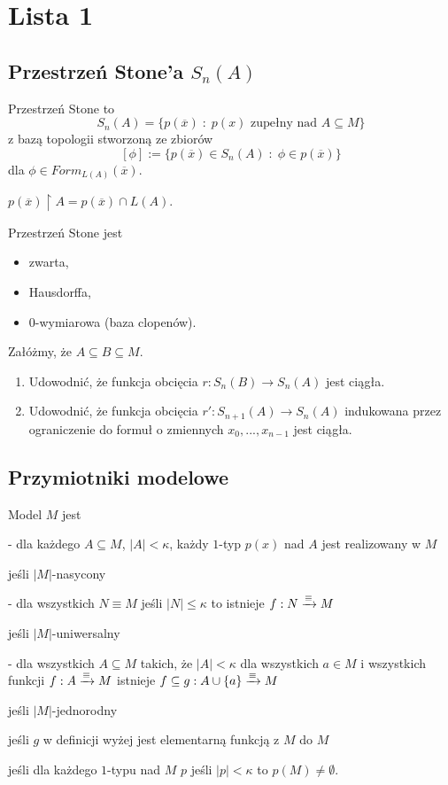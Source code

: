 \section{Lista 1}

\subsection{Przestrzeń Stone'a $S_n(A)$}

Przestrzeń Stone to
$$S_n(A)=\{p(\overline{x})\;:\;p(x)\text{ zupełny nad }A\subseteq M\}$$
z bazą topologii stworzoną ze zbiorów
$$[\phi]:=\{p(\overline{x})\in S_n(A)\;:\;\phi\in p(\overline{x})\}$$
dla $\phi\in Form_{L(A)}(\overline{x})$.

$p(\overline{x})\restriction{A}=p(\overline{x})\cap L(A)$.

Przestrzeń Stone jest
\begin{itemize}
  \item zwarta,
  \item Hausdorffa,
  \item 0-wymiarowa (baza clopenów).
\end{itemize}


\begin{zadanie}
  Załóżmy, że $A\subseteq B\subseteq M$.
  \begin{enumerate}[label=(\alph*)]
    \item Udowodnić, że funkcja obcięcia $r:S_n(B)\to S_n(A)$ jest ciągła.
    \item Udowodnić, że funkcja obcięcia $r':S_{n+1}(A)\to S_n(A)$ indukowana przez ograniczenie do formuł o zmiennych $x_0,...,x_{n-1}$ jest ciągła.
  \end{enumerate}
\end{zadanie}

\subsection{Przymiotniki modelowe}

Model $M$ jest 
\begin{description}[font=\bfseries\color{green}]
  \item[$\kappa$-nasycony] - dla każdego $A\subseteq M$, $|A|<\kappa$, każdy $1$-typ $p(x)$ nad $A$ jest realizowany w $M$
  \item[nasycony] jeśli $|M|$-nasycony
  \item[$\kappa$-uniwersalny] - dla wszystkich $N\equiv M$ jeśli $|N|\leq \kappa$ to istnieje $f:N\xrightarrow{\equiv} M$
  \item[uniwersalny] jeśli $|M|$-uniwersalny
  \item[$\kappa$-jednorodny] - dla wszystkich $A\subseteq M$ takich, że $|A|<\kappa$ dla wszystkich $a\in M$ i wszystkich funkcji $f:A\xrightarrow{\equiv} M$ istnieje $f\subseteq g:A\cup\{a\}\xrightarrow{\equiv} M$
  \item[jednorodny] jeśli $|M|$-jednorodny 
  \item[silnie $\kappa$-jednorodny] jeśli $g$ w definicji wyżej jest elementarną funkcją z $M$ do $M$ 
  \item[$\kappa$-zwarty] jeśli dla każdego $1$-typu nad $M$ $p$ jeśli $|p|<\kappa$ to $p(M)\neq \emptyset$.
\end{description}

